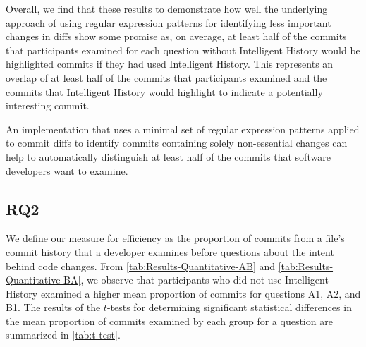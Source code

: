Overall, we find that these results to demonstrate how well the underlying approach of using regular expression
patterns for identifying less important changes in diffs show some promise as, on average,
at least half of the commits that participants examined for each question without Intelligent History
would be highlighted commits if they had used Intelligent History.
This represents an overlap of at least half of the commits that participants examined and the commits
that Intelligent History would highlight to indicate a potentially interesting commit.

\begin{summary}[RQ1]
  An implementation that uses a minimal set of regular expression patterns 
  applied to commit diffs to identify commits containing solely non-essential changes can help to
  automatically distinguish at least half of the commits that software
  developers want to examine.
\end{summary}


\subsection{RQ2}
\label{subsec:RQ2}


We define our measure for efficiency as the proportion of commits from a file's commit history 
that a developer examines before  questions about the intent behind code changes.
From \autoref{tab:Results-Quantitative-AB} and \autoref{tab:Results-Quantitative-BA}, 
we observe that participants who did not use Intelligent History 
examined a higher mean proportion of commits for questions A1, A2, and B1.
The results of the $t$-tests for determining significant statistical differences in 
the mean proportion of commits examined by each group for a question are summarized in \autoref{tab:t-test}.

